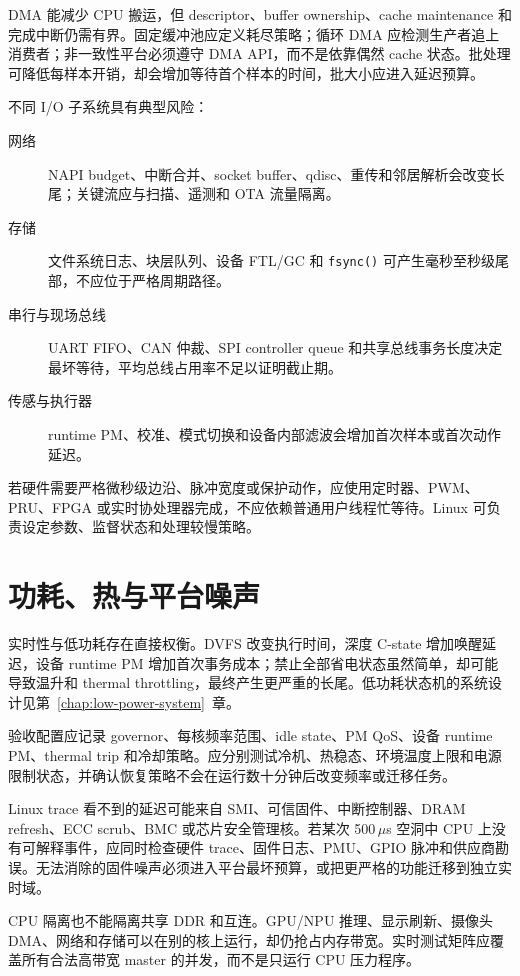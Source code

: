 DMA 能减少 CPU 搬运，但 descriptor、buffer ownership、cache maintenance 和完成中断仍需有界。固定缓冲池应定义耗尽策略；循环 DMA 应检测生产者追上消费者；非一致性平台必须遵守 DMA API，而不是依靠偶然 cache 状态。批处理可降低每样本开销，却会增加等待首个样本的时间，批大小应进入延迟预算。

不同 I/O 子系统具有典型风险：

\begin{description}
  \item[网络] NAPI budget、中断合并、socket buffer、qdisc、重传和邻居解析会改变长尾；关键流应与扫描、遥测和 OTA 流量隔离。
  \item[存储] 文件系统日志、块层队列、设备 FTL/GC 和 \texttt{fsync()} 可产生毫秒至秒级尾部，不应位于严格周期路径。
  \item[串行与现场总线] UART FIFO、CAN 仲裁、SPI controller queue 和共享总线事务长度决定最坏等待，平均总线占用率不足以证明截止期。
  \item[传感与执行器] runtime PM、校准、模式切换和设备内部滤波会增加首次样本或首次动作延迟。
\end{description}

若硬件需要严格微秒级边沿、脉冲宽度或保护动作，应使用定时器、PWM、PRU、FPGA 或实时协处理器完成，不应依赖普通用户线程忙等待。Linux 可负责设定参数、监督状态和处理较慢策略。

\section{功耗、热与平台噪声}

实时性与低功耗存在直接权衡。DVFS 改变执行时间，深度 C-state 增加唤醒延迟，设备 runtime PM 增加首次事务成本；禁止全部省电状态虽然简单，却可能导致温升和 thermal throttling，最终产生更严重的长尾。低功耗状态机的系统设计见\mbox{第~\ref{chap:low-power-system}~章}。

验收配置应记录 governor、每核频率范围、idle state、PM QoS、设备 runtime PM、thermal trip 和冷却策略。应分别测试冷机、热稳态、环境温度上限和电源限制状态，并确认恢复策略不会在运行数十分钟后改变频率或迁移任务。

Linux trace 看不到的延迟可能来自 SMI、可信固件、中断控制器、DRAM refresh、ECC scrub、BMC 或芯片安全管理核。若某次 500\,$\mu$s 空洞中 CPU 上没有可解释事件，应同时检查硬件 trace、固件日志、PMU、GPIO 脉冲和供应商勘误。无法消除的固件噪声必须进入平台最坏预算，或把更严格的功能迁移到独立实时域。

CPU 隔离也不能隔离共享 DDR 和互连。GPU/NPU 推理、显示刷新、摄像头 DMA、网络和存储可以在别的核上运行，却仍抢占内存带宽。实时测试矩阵应覆盖所有合法高带宽 master 的并发，而不是只运行 CPU 压力程序。

